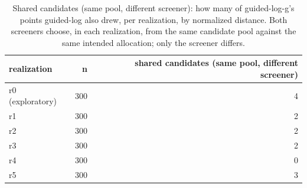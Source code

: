 \begin{table}[htbp]
\centering
\caption{Shared candidates (same pool, different screener): how many of guided-log-g's points guided-log also drew, per realization, by normalized distance. Both screeners choose, in each realization, from the same candidate pool against the same intended allocation; only the screener differs.}
\label{tab:structural:shared_candidates}
\begin{tabular}{lrr}
\toprule
realization & n & shared candidates (same pool, different screener) \\
\midrule
r0 (exploratory) & 300 & 4 \\
r1 & 300 & 2 \\
r2 & 300 & 2 \\
r3 & 300 & 2 \\
r4 & 300 & 0 \\
r5 & 300 & 3 \\
\bottomrule
\end{tabular}
\end{table}
